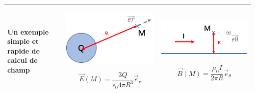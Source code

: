 \documentclass[a4paper,12pt]{book}
\begin{document}
\begin{landscape}
\begin{table}[h]
\begin{tabular}{|m{4cm}<{\centering}|m{10cm}<{\centering}|m{10cm}<{\centering}|}
    
    \\ \hline
    
    
    Un exemple simple et rapide de calcul de champ 
    &
    \includegraphics[scale=1]{elec31.png}


    $$\vec{E}(M)=\frac{3Q}{\epsilon_0 4\pi R^3}\vec{e}_r$$
    & 
    \includegraphics[scale=1]{elec32.png}

    $$\vec{B}(M)=\frac{\mu_0I}{2\pi R}\vec{e}_\theta$$

     \\
    
     \hline
    \end{tabular}
    \end{table}
\end{landscape}
\end{document}
